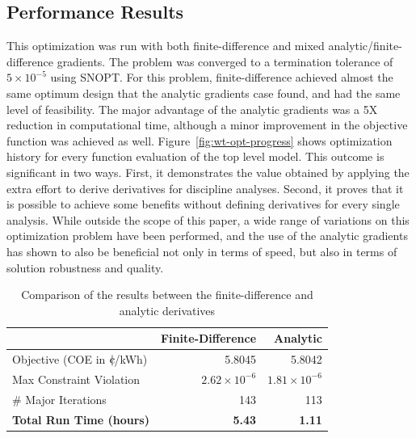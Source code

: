 \documentclass[]{aiaa-tc} %
\newcommand{\cent}{{\mathrm{c}\mkern-6.5mu{\mid}}}
\begin{document}
    \subsection{Performance Results}
        This optimization was run with both finite-difference and mixed analytic/finite-difference gradients.  The problem was converged to a termination tolerance of $5\times10^{-5}$ using SNOPT.  For this problem, finite-difference achieved almost the same optimum design that the analytic gradients case found, and had the same level of feasibility. The major advantage of the analytic gradients was a 5X reduction in computational time, although a minor improvement in the objective function was achieved as well. Figure~\ref{fig:wt-opt-progress} shows optimization
        history for every function evaluation of the top level model. This outcome is significant in two ways. First, it demonstrates the value obtained by applying the extra effort to derive derivatives for discipline analyses. Second, it proves that it is possible to achieve some benefits without defining derivatives for every single analysis. While outside the scope of this paper, a wide range of variations on this optimization problem have been performed, and the use of the analytic gradients has shown to also be beneficial not only in terms of speed, but also in terms of solution robustness and quality.



        \begin{table}
            \centering
            \caption{Comparison of the results between the finite-difference and analytic derivatives}
            \begin{tabular}{lrr}
                \toprule
                                                      & Finite-Difference & Analytic \\
                \midrule
                Objective (COE  in $\cent$/kWh)       & 5.8045  & 5.8042 \\ 
                Max Constraint Violation             & $2.62\times10^{-6}$ & $1.81\times10^{-6}$  \\ 
                \# Major Iterations                   &  143 & 113  \\
                \textbf{Total Run Time (hours)}       &  \textbf{5.43} & \textbf{1.11} \\

                \bottomrule
            \end{tabular}
            \label{tab:wt-fd-speeds}
        \end{table}
\end{document}
